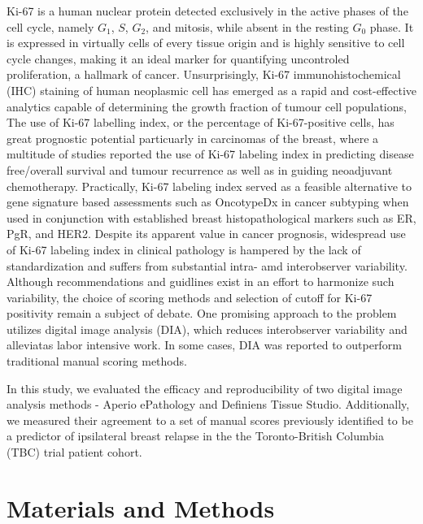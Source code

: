 \documentclass[final,5p,times,twocolumn]{elsarticle}
\begin{document}
Ki-67 is a human nuclear protein detected exclusively in the active phases of the cell cycle, namely $G_1$, $S$, $G_2$, and mitosis, while absent in the resting $G_0$ phase.\cite{Gerdes1984} It is expressed in virtually cells of every tissue origin and is highly sensitive to cell cycle changes, making it an ideal marker for quantifying uncontroled proliferation, a hallmark of cancer. Unsurprisingly, Ki-67 immunohistochemical (IHC) staining of human neoplasmic cell has emerged as a rapid and cost-effective analytics capable of determining the growth fraction of tumour cell populations,  \cite{Scholzen2000} The use of Ki-67 labelling index, or the percentage of Ki-67-positive cells, has great prognostic potential particuarly in carcinomas of the breast, where a multitude of studies reported the use of Ki-67 labeling index in predicting disease free/overall survival and tumour recurrence \cite{Stuart-Harris2005, DeAzambuja2007} as well as in guiding neoadjuvant chemotherapy. \cite{Jones2009, Nishimura2010, Fasching2011} Practically, Ki-67 labeling index served as a feasible alternative to gene signature based assessments such as OncotypeDx in cancer subtyping when used in conjunction with established breast histopathological markers such as ER, PgR, and HER2. \cite{Cuzick2011} Despite its apparent value in cancer prognosis, widespread use of Ki-67 labeling index in clinical pathology is hampered by the lack of standardization and suffers from substantial intra- amd interobserver variability. \cite{Dowsett2011a, Polley2013a} Although recommendations and guidlines exist in an effort to harmonize such variability, \cite{Polley2015} the choice of scoring methods and selection of cutoff for Ki-67 positivity remain a subject of debate. One promising approach to the problem utilizes digital image analysis (DIA), which reduces interobserver variability and alleviatas labor intensive work. In some cases, DIA was reported to outperform traditional manual scoring methods. \cite{Stalhammar2016}

In this study, we evaluated the efficacy and reproducibility of two digital image analysis methods - Aperio ePathology and Definiens Tissue Studio. Additionally, we measured their agreement to a set of manual scores previously identified to be a predictor of ipsilateral breast relapse in the the Toronto-British Columbia (TBC) trial patient cohort. \cite{Liu2015}

\cite{Scholzen2000}

\section*{Materials and Methods}
\end{document}
